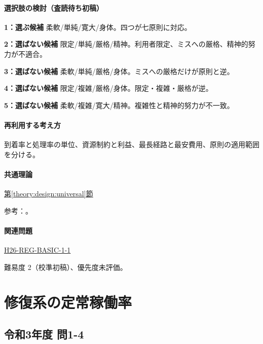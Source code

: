 \paragraph{選択肢の検討（査読待ち初稿）}\mbox{}\par

\noindent\textbf{1：選ぶ候補} 柔軟/単純/寛大/身体。四つが七原則に対応。\par

\noindent\textbf{2：選ばない候補} 限定/単純/厳格/精神。利用者限定、ミスへの厳格、精神的努力が不適合。\par

\noindent\textbf{3：選ばない候補} 柔軟/単純/厳格/身体。ミスへの厳格だけが原則と逆。\par

\noindent\textbf{4：選ばない候補} 限定/複雑/厳格/身体。限定・複雑・厳格が逆。\par

\noindent\textbf{5：選ばない候補} 柔軟/複雑/寛大/精神。複雑性と精神的努力が不一致。\par

\paragraph{再利用する考え方} 到着率と処理率の単位、資源制約と利益、最長経路と最安費用、原則の適用範囲を分ける。

\paragraph{共通理論} \hyperref[theory:design:universal]{第\ref*{theory:design:universal}節}

\par 参考：\cite{design48_ud}。

\paragraph{関連問題} \hyperref[q:h26-reg-basic-1-1]{H26-REG-BASIC-1-1}

\par 難易度 2（校準初稿）、優先度未評価。

\section{修復系の定常稼働率}

\subsection{令和3年度 問1-4}
\label{q:r03-reg-basic-1-4}

